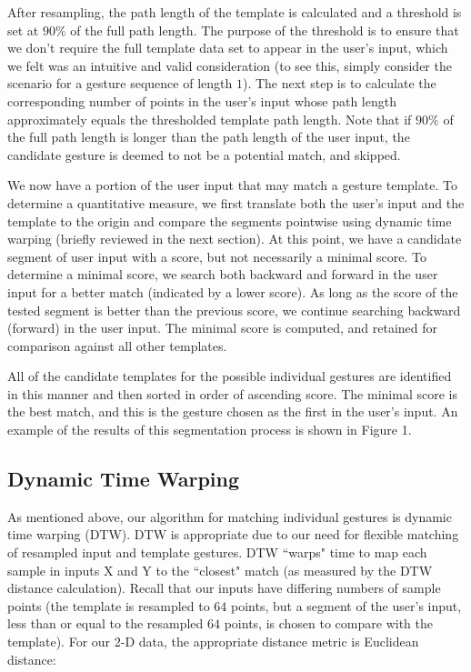 \documentclass[twoside]{article}
\begin{document}
\begin{multicols}{2}
After resampling, the path length of the template is calculated and a threshold
is set at $90\%$ of the full path length. The purpose of the threshold is to
ensure that we don't require the full template data set to appear in the user's
input, which we felt was an intuitive and valid consideration (to see this,
simply consider the scenario for a gesture sequence of length $1$). The next
step is to calculate the corresponding number of points in the user's input
whose path length approximately equals the thresholded template path length.
Note that if $90\%$ of the full path length is longer than the path length of
the user input, the candidate gesture is deemed to not be a potential match, and
skipped.

We now have a portion of the user input that may match a gesture template. To
determine a quantitative measure, we first translate both the user's input and
the template to the origin and compare the segments pointwise using dynamic time
warping (briefly reviewed in the next section).
At this point, we have a candidate segment of user input with a score, but not
necessarily a minimal score. To determine a minimal score, we search both
backward and forward in the user input for a better match (indicated by a lower
score). As long as the score of the tested segment is better than the previous
score, we continue searching backward (forward) in the user input. The minimal
score is computed, and retained for comparison against all other templates.

All of the candidate templates for the possible individual gestures are
identified in this manner and then sorted in order of ascending score. The
minimal score is the best match, and this is the gesture chosen as the first in
the user's input. An example of the results of this segmentation process is
shown in Figure 1.

\subsection*{Dynamic Time Warping}

As mentioned above, our algorithm for matching individual gestures is dynamic time warping (DTW).
DTW is appropriate due to our need for flexible matching of resampled input and template
gestures. %
DTW ``warps" time to map each sample in inputs X and Y to
the ``closest" match (as measured by the DTW distance calculation). Recall that our inputs
have differing numbers of sample points (the template is resampled to $64$ points, but a
segment of the user's input, less than or equal to the resampled $64$ points, is chosen
to compare with the template). For our 2-D data, the appropriate distance metric is Euclidean distance:


\end{multicols}
\end{document}
